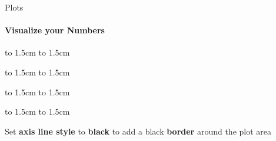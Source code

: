 \documentclass[aspectratio=169]{beamer}
\begin{document}
\begin{frame}{Plots}
    \framesubtitle{Visualize your Numbers}
    \begin{minipage}[t]{0.49\textwidth}
        \vspace{-1cm}
        
        \begin{minipage}[c]{0.14\textwidth}
            \begin{coloredblockdark}[blue][][][1.5cm]
               \vbox to 1.5cm {
                    \vfil
                        \hbox to 1.5cm {
                            \hfill
                                \large{}
                            \hfill
                        }
                    \vfil
                }
            \end{coloredblockdark}
            \begin{coloredblockdark}[yellow][][][1.5cm]
               \vbox to 1.5cm {
                    \vfil
                        \hbox to 1.5cm {
                            \hfill
                                \large{}
                            \hfill
                        }
                    \vfil
                }
            \end{coloredblockdark}
            \begin{coloredblockdark}[grey][][][1.5cm]
               \vbox to 1.5cm {
                    \vfil
                        \hbox to 1.5cm {
                            \hfill
                                \large{}
                            \hfill
                        }
                    \vfil
                }
            \end{coloredblockdark}
            \begin{coloredblockdark}[green][][][1.5cm]
               \vbox to 1.5cm {
                    \vfil
                        \hbox to 1.5cm {
                            \hfill
                                \large{}
                            \hfill
                        }
                    \vfil
                }
            \end{coloredblockdark}
        \end{minipage}
        \hfill
        \begin{minipage}[c]{0.84\textwidth}
            \begin{coloredblock}[blue][][][1.5cm]
                \footnotesize
                Set \textbf{axis line style} to \textbf{black} to add a black \textbf{border} around the plot area

\end{coloredblock}
\end{minipage}
\end{minipage}
\end{frame}
\end{document}
